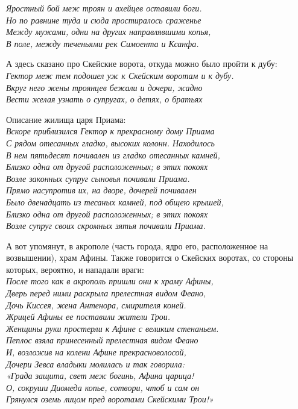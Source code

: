 \noindent
\textit{Яростный бой меж троян и ахейцев оставили боги.\\
Но по равнине туда и сюда простиралось сраженье\\
Между мужами, одни на других направлявшими копья,\\
В поле, между теченьями рек Симоента и Ксанфа.\\}

А здесь сказано про Скейские ворота, откуда можно было пройти к дубу:\\

\noindent
\textit{Гектор меж тем подошел уж к Скейским воротам и к дубу.\\
Вкруг него жены троянцев бежали и дочери, жадно\\
Вести желая узнать о супругах, о детях, о братьях\\}

Описание жилища царя Приама:\\

\noindent
\textit{Вскоре приблизился Гектор к прекрасному дому Приама\\
С рядом отесанных гладко, высоких колонн. Находилось\\
В нем пятьдесят почивален из гладко отесанных камней,\\
Близко одна от другой расположенных; в этих покоях\\
Возле законных супруг сыновья почивали Приама.\\
Прямо насупротив их, на дворе, дочерей почивален\\
Было двенадцать из тесаных камней, под общею крышей,\\
Близко одна от другой расположенных; в этих покоях\\
Возле супруг своих скромных зятья почивали Приама.\\}

А вот упомянут, в акрополе (часть города, ядро его, расположенное на возвышении), храм Афины. Также говорится о Скейских воротах, со стороны которых, вероятно, и нападали враги:\\

\noindent
\textit{После того как в акрополь пришли они к храму Афины,\\
Дверь перед ними раскрыла прелестная видом Феано,\\
Дочь Киссея, жена Антенора, смирителя коней.\\
Жрицей Афины ее поставили жители Трои.\\
Женщины руки простерли к Афине с великим стенаньем.\\
Пеплос взяла принесенный прелестная видом Феано\\
И, возложив на колени Афине прекрасноволосой,\\
Дочери Зевса владыки молилась и так говорила:\\
«Града защита, свет меж богинь, Афина царица!\\
О, сокруши Диомеда копье, сотвори, чтоб и сам он\\
Грянулся оземь лицом пред воротами Скейскими Трои!»\\}

